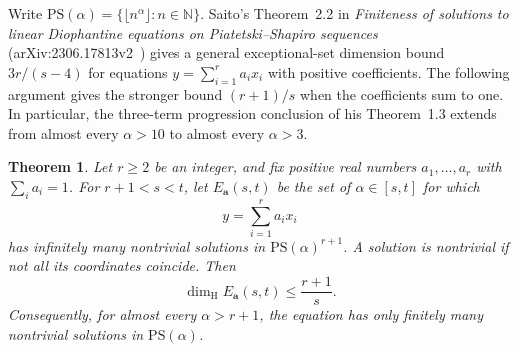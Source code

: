\documentclass[11pt,a4paper]{article}
\newtheorem{theorem}{Theorem}[section]
\theoremstyle{definition}
\theoremstyle{remark}
\numberwithin{equation}{section}
\begin{document}
Write $\mathrm{PS}(\alpha)=\{\lfloor n^\alpha\rfloor:n\in\mathbb N\}$.
Saito's Theorem~2.2 in \emph{Finiteness of solutions to linear
Diophantine equations on Piatetski--Shapiro sequences}
(arXiv:2306.17813v2~\cite{SaitoBalanced}) gives a general exceptional-set dimension bound
$3r/(s-4)$ for equations $y=\sum_{i=1}^r a_i x_i$ with positive
coefficients. The following argument gives the stronger bound $(r+1)/s$
when the coefficients sum to one. In particular, the three-term
progression conclusion of his Theorem~1.3 extends from almost every
$\alpha>10$ to almost every $\alpha>3$.

\begin{theorem}\label{sur:thm:ps-balanced}
Let $r\ge2$ be an integer, and fix positive real numbers
$a_1,\ldots,a_r$ with $\sum_i a_i=1$. For $r+1<s<t$, let
$E_{\boldsymbol a}(s,t)$ be the set of $\alpha\in[s,t]$ for which
\[
 y=\sum_{i=1}^r a_i x_i
\]
has infinitely many nontrivial solutions in
$\mathrm{PS}(\alpha)^{r+1}$. A solution is nontrivial if not all its
coordinates coincide. Then
\[
 \dim_{\mathrm H}E_{\boldsymbol a}(s,t)\le\frac{r+1}{s}.
\]
Consequently, for almost every $\alpha>r+1$, the equation has only
finitely many nontrivial solutions in $\mathrm{PS}(\alpha)$.
\end{theorem}
\end{document}
